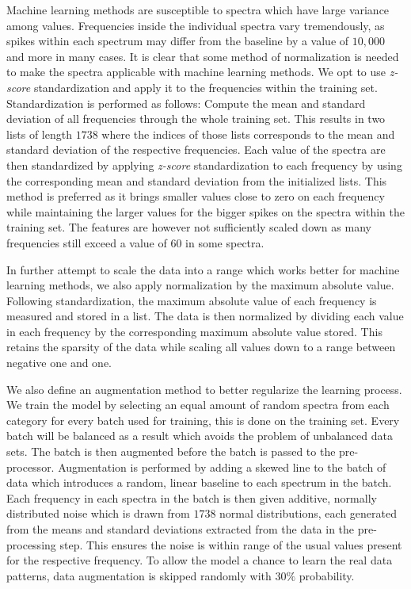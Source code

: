 Machine learning methods are susceptible to spectra which have large variance among values. Frequencies inside the individual spectra vary tremendously, as spikes within each spectrum may differ from the baseline by a value of $10,000$ and more in many cases. It is clear that some method of normalization is needed to make the spectra applicable with machine learning methods. We opt to use \textit{z-score} standardization and apply it to the frequencies within the training set. Standardization is performed as follows: Compute the mean and standard deviation of all frequencies through the whole training set. This results in two lists of length $1738$ where the indices of those lists corresponds to the mean and standard deviation of the respective frequencies. Each value of the spectra are then standardized by applying \textit{z-score} standardization to each frequency by using the corresponding mean and standard deviation from the initialized lists. This method is preferred as it brings smaller values close to zero on each frequency while maintaining the larger values for the bigger spikes on the spectra within the training set. The features are however not sufficiently scaled down as many frequencies still exceed a value of $60$ in some spectra.

In further attempt to scale the data into a range which works better for machine learning methods, we also apply normalization by the maximum absolute value. Following standardization, the maximum absolute value of each frequency is measured and stored in a list. The data is then normalized by dividing each value in each frequency by the corresponding maximum absolute value stored. This retains the sparsity of the data while scaling all values down to a range between negative one and one.

We also define an augmentation method to better regularize the learning process. We train the model by selecting an equal amount of random spectra from each category for every batch used for training, this is done on the training set. Every batch will be balanced as a result which avoids the problem of unbalanced data sets. The batch is then augmented before the batch is passed to the pre-processor. Augmentation is performed by adding a skewed line to the batch of data which introduces a random, linear baseline to each spectrum in the batch. Each frequency in each spectra in the batch is then given additive, normally distributed noise which is drawn from $1738$ normal distributions, each generated from the means and standard deviations extracted from the data in the pre-processing step. This ensures the noise is within range of the usual values present for the respective frequency. To allow the model a chance to learn the real data patterns, data augmentation is skipped randomly with $30\%$ probability.

